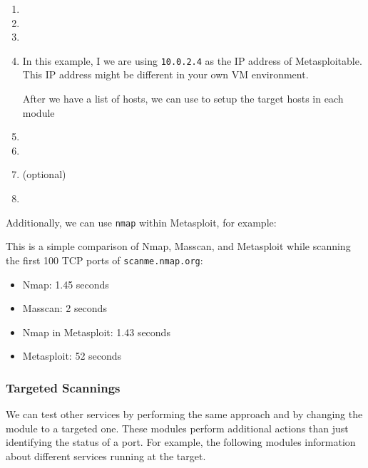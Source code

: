 \begin{enumerate}
    \item {}
    \item {}
    \item {}
    \item {}
    \begin{warnbox}[frametitle=Warning: Metasploitable IP Addess,outermargin=-25pt]
        In this example, I we are using \texttt{10.0.2.4} as the IP address of Metasploitable. This IP address might be different in your own VM environment.
    \end{warnbox}
    \begin{tipbox}[outermargin=-25pt]
        After we have a list of hosts, we can use  to setup the target hosts in each module
    \end{tipbox}
    \item {}
    \item {}
    \item (optional) 
    \item {}
\end{enumerate}

Additionally, we can use \texttt{nmap} within Metasploit, for example:


\begin{infobox}[frametitle=Info: Speed Comparison]
    This is a simple comparison of Nmap, Masscan, and Metasploit while scanning the first 100 TCP ports of \texttt{scanme.nmap.org}:
    \begin{itemize}
        \item Nmap: 1.45 seconds
        \item Masscan: 2 seconds
        \item Nmap in Metasploit: 1.43 seconds
        \item Metasploit: 52 seconds
    \end{itemize}
\end{infobox}


\subsubsection{Targeted Scannings}
We can test other services by performing the same approach and by changing the module to a targeted one. These modules perform additional actions than just identifying the status of a port. For example, the following modules information about different services running at the target.

